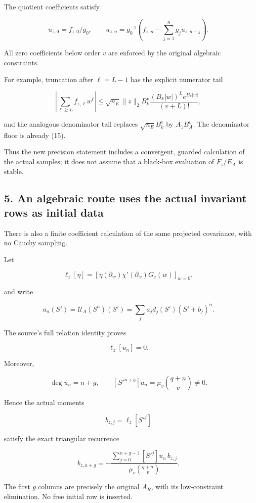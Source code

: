 \documentclass[11pt]{article}
\begin{document}
The quotient coefficients satisfy

\[
\boxed{
u_{z,0}=f_{z,0}/g_0,\qquad
u_{z,n}
=
g_0^{-1}
\left(
f_{z,n}-\sum_{j=1}^ng_ju_{z,n-j}
\right).
}
\tag{26}
\]

All zero coefficients below order \(v\) are enforced by the original algebraic constraints.

For example, truncation after \(\ell=L-1\) has the explicit numerator tail

\[
\left|
\sum_{\ell\ge L}f_{z,\ell}w^\ell
\right|
\le
\sqrt{n_E}\|z\|_2 B_k^v
\frac{(B_k|w|)^Le^{B_k|w|}}{(v+L)!},
\tag{27}
\]

and the analogous denominator tail replaces \(\sqrt{n_E}B_k^v\) by \(A_1B_A^v\). The denominator floor is already (15).

Thus the new precision statement includes a convergent, guarded calculation of the actual samples; it does not assume that a black-box evaluation of \(F_z/E_A\) is stable.

\subsection{5. An algebraic route uses the actual invariant rows as initial data}\label{an-algebraic-route-uses-the-actual-invariant-rows-as-initial-data}

There is also a finite coefficient calculation of the same projected covariance, with no Cauchy sampling.

Let

\[
\ell_z[\eta]
=
[\eta(\partial_w)\chi'(\partial_w)G_z(w)]_{w=0},
\]

and write

\[
u_n(S')
=
\mathcal U_A(S^n)(S')
=
\sum_j a_jd_j(S')(S'+b_j)^n.
\]

The source's full relation identity proves

\[
\ell_z[u_n]=0.
\]

Moreover,

\[
\deg u_n=n+g,
\qquad
[S'^{n+g}]u_n
=
\mu_v\binom{q+n}{v}\ne0.
\]

Hence the actual moments

\[
b_{z,j}=\ell_z[S'^j]
\]

satisfy the exact triangular recurrence

\[
\boxed{
b_{z,n+g}
=
-\frac{
\sum_{j=0}^{n+g-1}[S'^j]u_n\,b_{z,j}
}{
\mu_v\binom{q+n}{v}
}.
}
\tag{28}
\]

The first \(g\) columns are precisely the original \(A_R\), with its low-constraint elimination. No free initial row is inserted.
\end{document}
